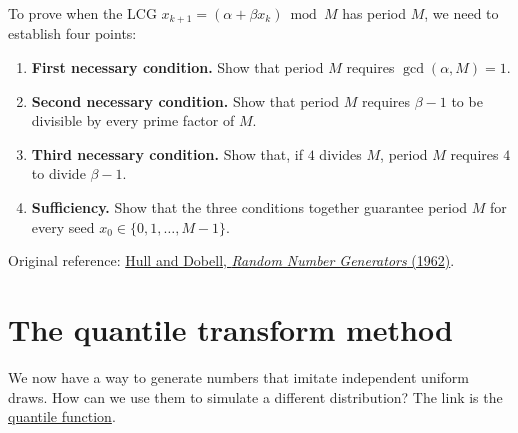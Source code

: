 \documentclass[a4paper,12pt,oneside]{report}
\begin{document}
\begin{notebox}
To prove when the LCG $x_{k+1}=(\alpha+\beta x_k)\bmod M$ has
period $M$, we need to establish four points:
\begin{enumerate}
  \item \textbf{First necessary condition.} Show that period $M$
    requires $\gcd(\alpha,M)=1$.
  \item \textbf{Second necessary condition.} Show that period $M$
    requires $\beta-1$ to be divisible by every prime factor of $M$.
  \item \textbf{Third necessary condition.} Show that, if $4$ divides
    $M$, period $M$ requires $4$ to divide $\beta-1$.
  \item \textbf{Sufficiency.} Show that the three conditions together
    guarantee period $M$ for every seed
    $x_0\in\{0,1,\ldots,M-1\}$.
\end{enumerate}
Original reference:
\href{https://epubs.siam.org/doi/10.1137/1004061}{Hull and Dobell,
\textit{Random Number Generators} (1962)}.
\end{notebox}

\clearpage
\section{The quantile transform method}
\label{sec:quantile-transform}
We now have a way to generate numbers that imitate independent
uniform draws. How can we use them to simulate a different
distribution? The link is the
\hyperref[def:quantile-general]{quantile function}.
\end{document}
